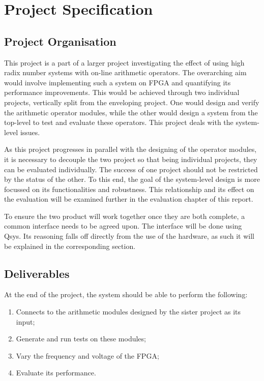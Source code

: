 \section{Project Specification}

\subsection{Project Organisation}
This project is a part of a larger project investigating the effect of using
high radix number systems with on-line arithmetic operators.
The overarching aim would involve implementing such a system on FPGA and
quantifying its performance improvements.
This would be achieved through two individual projects, vertically split from
the enveloping project.
One would design and verify the arithmetic operator modules,
while the other would design a system from the top-level to test and
evaluate these operators.
This project deals with the system-level issues.

As this project progresses in parallel with the designing of the operator
modules, it is necessary to decouple the two project so that being individual
projects, they can be evaluated individually.
The success of one project should not be restricted by the status of the other.
To this end, the goal of the system-level design is more focussed on its
functionalities and robustness.
This relationship and its effect on the evaluation will be examined further in
the evaluation chapter of this report.

To ensure the two product will work together once they are both complete, a
common interface needs to be agreed upon.
The interface will be done using Qsys.
Its reasoning falls off directly from the use of the hardware,
as such it will be explained in the corresponding section.


\subsection{Deliverables}
At the end of the project, the system should be able to perform the following:
\begin{enumerate}
  \item Connects to the arithmetic modules designed by the sister project as its
        input;
  \item Generate and run tests on these modules;
  \item Vary the frequency and voltage of the FPGA;
  \item Evaluate its performance.
\end{enumerate}


